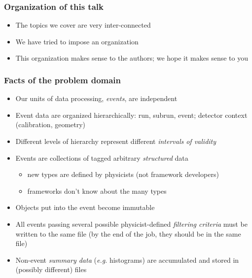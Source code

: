 \documentclass{beamer}
\begin{document}

\begin{frame}
  \frametitle{Organization of this talk}
  \begin{itemize}
    \item The topics we cover are very inter-connected
    \item We have tried to impose an organization
    \item This organization makes sense to the authors; we hope it makes
          sense to you
  \end{itemize}
\end{frame}

\begin{frame}
  \frametitle{Facts of the problem domain}
  \begin{itemize}
    \item Our units of data processing, \emph{events}, are
          independent
    \item Event data are organized hierarchically: run, subrun, event;
          detector context (calibration, geometry)
    \item Different levels of hierarchy represent different \emph{intervals
          of validity}
    \item Events are collections of tagged arbitrary \emph{structured} data
    \begin{itemize}
      \item new types are defined by physicists (not framework developers)
      \item frameworks don't know about the many types
    \end{itemize}
    \item Objects put into the event become immutable
    \item All events passing several possible physicist-defined
          \emph{filtering criteria} must be written to the same file
          (by the end of the job, they should be in the same file)
     \item Non-event \emph{summary data} (\textit{e.g.} histograms) are
           accumulated and stored in (possibly different) files
  \end{itemize}
\end{frame}
\end{document}
